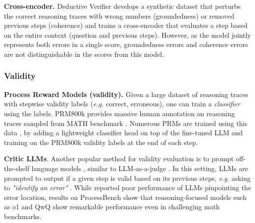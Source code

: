 
\textbf{Cross-encoder.}  \hspace{0.1cm} Deductive Verifier \citep{zhu2024deductivebeamsearchdecoding} develops a synthetic dataset that perturbs the correct reasoning traces with wrong numbers (groundedness) or removed previous steps (coherence) and trains a cross-encoder that evaluates a step based on the entire context (question and previous steps). However, as the model jointly represents both errors in a single score, groundedness errors and coherence errors are not distinguishable in the scores from this model.

\subsubsection{Validity}


\textbf{Process Reward Models (validity).} \hspace{0.1cm} Given a large dataset of reasoning traces with stepwise validity labels (\textit{e.g.} correct, erroneous), one can train a \textit{classifier} using the labels. PRM800k \citep{DBLP:conf/iclr/LightmanKBEBLLS24} provides massive human annotation on reasoning traces sampled from MATH benchmark \citep{NEURIPSDnB2021_be83ab3e}. Numerous PRMs are trained using this data \citep{DBLP:conf/iclr/LightmanKBEBLLS24, gao2024llmcriticshelpcatch, zhang2025lessonsdevelopingprocessreward}, by adding a lightweight classifier head on top of the fine-tuned LLM and training on the PRM800k validity labels at the end of each step.


\textbf{Critic LLMs}. \hspace{0.1cm} Another popular method for validity evaluation is to prompt off-the-shelf language models \citep{jacovi-etal-2024-chain, tyen-etal-2024-llms, zheng2024processbenchidentifyingprocesserrors}, similar to LLM-as-a-judge \citep{NEURIPS2023_91f18a12}. In this setting, LLMs are prompted to output if a given step is valid based on its previous steps, \textit{e.g.} asking to \textit{"identify an error"} \citep{zheng2024processbenchidentifyingprocesserrors}. While \citet{tyen-etal-2024-llms} reported poor performance of LLMs pinpointing the error location, results on ProcessBench \citep{zheng2024processbenchidentifyingprocesserrors} show that reasoning-focused models such as o1 \citep{openai2024openaio1card} and QwQ \citep{qwenlmQwQReflect} show remarkable performance even in challenging math benchmarks.


